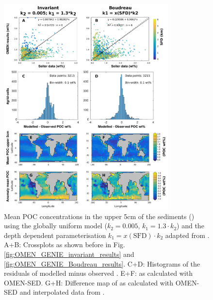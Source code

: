 \documentclass[gmd, manuscript]{copernicus}
\begin{document}
\begin{figure}[htbp]
\begin{center}
	\includegraphics[width=0.8\textwidth]{figures/OMEN-GENIE-Exp/0_2908_BOUDREAU_DEPTH_DEP_POC.pdf}
	\caption{Mean POC concentrations in the upper 5cm of the sediments () using the globally uniform model ($k_2 = 0.005$, $k_1 = 1.3\cdot k_2$) and the depth dependent parameterisation $k_1 = x(\mathrm{SFD}) \cdot k_2$ 
	adapted from \citet{boudreau1997diagenetic}. 
	A+B: Crossplots as shown before in Fig. \ref{fig:OMEN_GENIE_invariant_results} and \ref{fig:OMEN_GENIE_Boudreau_results}. 
	C+D: Histograms of the residuals of modelled minus observed . 
	E+F:  as calculated with OMEN-SED. 
	G+H: Difference map of  as calculated with OMEN-SED and interpolated data from \citet{seiter_organic_2004}.
	}\label{fig:OMEN_GENIE_Boudreau_depth}
\end{center}
\end{figure}
\end{document}

